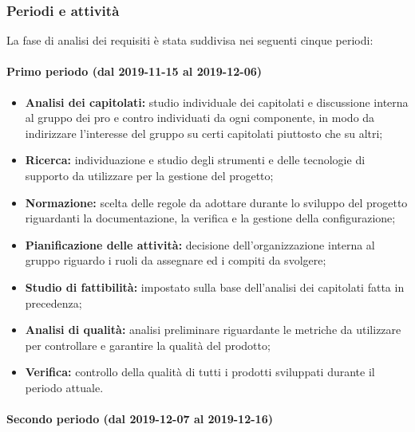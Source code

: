 		\subsubsection{Periodi e attività}
		
			La fase di analisi dei requisiti è stata suddivisa nei seguenti cinque periodi:
			
			\paragraph{Primo periodo (dal 2019-11-15 al 2019-12-06)}
			
				\begin{itemize}
					\item \textbf{Analisi dei capitolati:} studio individuale dei capitolati e discussione interna al gruppo dei pro e contro individuati da ogni componente, in modo da indirizzare l'interesse del gruppo su certi capitolati piuttosto che su altri;
					\item \textbf{Ricerca:} individuazione e studio degli strumenti e delle tecnologie di supporto da utilizzare per la gestione del progetto;
					\item \textbf{Normazione:} scelta delle regole da adottare durante lo sviluppo del progetto riguardanti la documentazione, la verifica e la gestione della configurazione;
					\item \textbf{Pianificazione delle attività:} decisione dell'organizzazione interna al gruppo riguardo i ruoli da assegnare ed i compiti da svolgere;
					\item \textbf{Studio di fattibilità:} impostato sulla base dell'analisi dei capitolati fatta in precedenza;
					\item \textbf{Analisi di qualità:} analisi preliminare riguardante le metriche da utilizzare per controllare e garantire la qualità del prodotto;
					\item \textbf{Verifica:} controllo della qualità di tutti i prodotti sviluppati durante il periodo attuale.
				\end{itemize}
			
			\paragraph{Secondo periodo (dal 2019-12-07 al 2019-12-16)}
			
